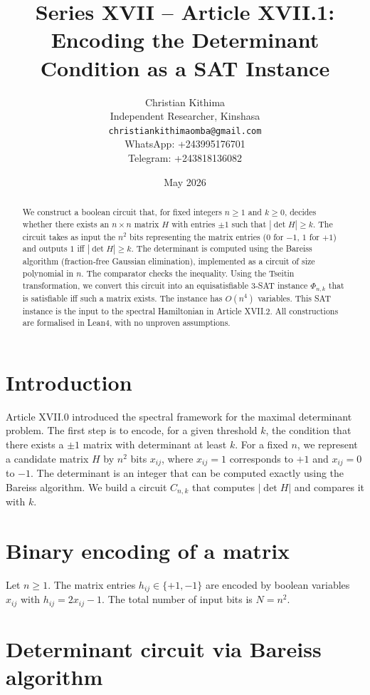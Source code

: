 \documentclass[11pt,a4paper]{article}
\title{Series XVII – Article XVII.1: Encoding the Determinant Condition as a SAT Instance}
\author{Christian Kithima \\
Independent Researcher, Kinshasa \\
\texttt{christiankithimaomba@gmail.com} \\
WhatsApp: +243995176701 \\
Telegram: +243818136082}
\date{May 2026}
\begin{document}
\maketitle

\begin{abstract}
We construct a boolean circuit that, for fixed integers $n\ge 1$ and $k\ge 0$, decides whether there exists an $n\times n$ matrix $H$ with entries $\pm1$ such that $|\det H| \ge k$. The circuit takes as input the $n^2$ bits representing the matrix entries ($0$ for $-1$, $1$ for $+1$) and outputs $1$ iff $|\det H| \ge k$. The determinant is computed using the Bareiss algorithm (fraction‑free Gaussian elimination), implemented as a circuit of size polynomial in $n$. The comparator checks the inequality. Using the Tseitin transformation, we convert this circuit into an equisatisfiable 3‑SAT instance $\Phi_{n,k}$ that is satisfiable iff such a matrix exists. The instance has $O(n^4)$ variables. This SAT instance is the input to the spectral Hamiltonian in Article XVII.2. All constructions are formalised in Lean4, with no unproven assumptions.
\end{abstract}

\tableofcontents

\section{Introduction}

Article XVII.0 introduced the spectral framework for the maximal determinant problem. The first step is to encode, for a given threshold $k$, the condition that there exists a $\pm1$ matrix with determinant at least $k$. For a fixed $n$, we represent a candidate matrix $H$ by $n^2$ bits $x_{ij}$, where $x_{ij}=1$ corresponds to $+1$ and $x_{ij}=0$ to $-1$. The determinant is an integer that can be computed exactly using the Bareiss algorithm. We build a circuit $C_{n,k}$ that computes $|\det H|$ and compares it with $k$.

\section{Binary encoding of a matrix}

Let $n\ge 1$. The matrix entries $h_{ij}\in\{+1,-1\}$ are encoded by boolean variables $x_{ij}$ with $h_{ij}=2x_{ij}-1$. The total number of input bits is $N=n^2$.

\section{Determinant circuit via Bareiss algorithm}
\end{document}
